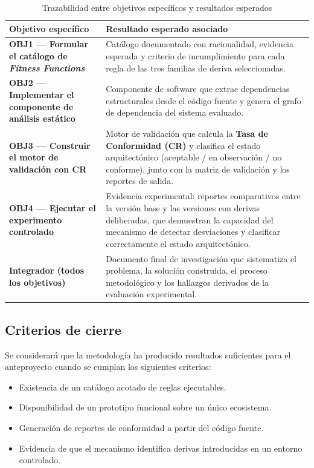 \begin{table}[H]
\caption{Trazabilidad entre objetivos específicos y resultados esperados}
\label{tab:trazabilidad}
\footnotesize
\begin{tabularx}{\linewidth}{p{5.0cm}X}
\toprule
\textbf{Objetivo específico} & \textbf{Resultado esperado asociado} \\
\midrule
\textbf{OBJ1 — Formular el catálogo de \textit{Fitness Functions}} &
Catálogo documentado con racionalidad, evidencia esperada y criterio de incumplimiento para cada regla de las tres familias de deriva seleccionadas. \\
\midrule
\textbf{OBJ2 — Implementar el componente de análisis estático} &
Componente de software que extrae dependencias estructurales desde el código fuente y genera el grafo de dependencia del sistema evaluado. \\
\midrule
\textbf{OBJ3 — Construir el motor de validación con CR} &
Motor de validación que calcula la \textbf{Tasa de Conformidad (CR)} y clasifica el estado arquitectónico (aceptable / en observación / no conforme), junto con la matriz de validación y los reportes de salida. \\
\midrule
\textbf{OBJ4 — Ejecutar el experimento controlado} &
Evidencia experimental: reportes comparativos entre la versión base y las versiones con derivas deliberadas, que demuestran la capacidad del mecanismo de detectar desviaciones y clasificar correctamente el estado arquitectónico. \\
\midrule
\textbf{Integrador (todos los objetivos)} &
Documento final de investigación que sistematiza el problema, la solución construida, el proceso metodológico y los hallazgos derivados de la evaluación experimental. \\
\bottomrule
\end{tabularx}
\end{table}

\subsection{Criterios de cierre}

Se considerará que la metodología ha producido resultados suficientes para el anteproyecto cuando se cumplan los siguientes criterios:

\begin{itemize}
    \item Existencia de un catálogo acotado de reglas ejecutables.
    \item Disponibilidad de un prototipo funcional sobre un único ecosistema.
    \item Generación de reportes de conformidad a partir del código fuente.
    \item Evidencia de que el mecanismo identifica derivas introducidas en un entorno controlado.
\end{itemize}

